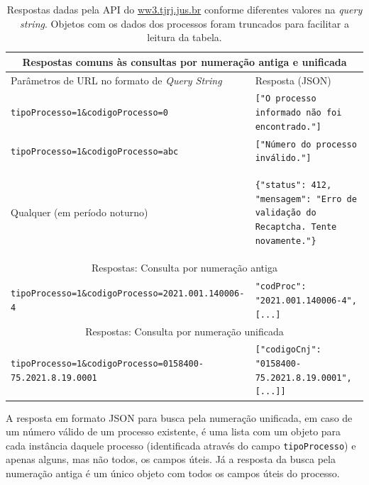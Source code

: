 \begin{table}[htb]
    \tiny
    \centering
    \begin{tabular}{lp{}}
        \toprule
        \multicolumn{2}{c}{Respostas comuns às consultas por numeração antiga e unificada} \\
        \midrule
        Parâmetros de URL no formato de \textit{Query String} & Resposta (JSON) \\
        \midrule
        \texttt{tipoProcesso=1\&codigoProcesso=0} & \texttt{["O processo informado não foi encontrado."]} \\
        \texttt{tipoProcesso=1\&codigoProcesso=abc} & \texttt{["Número do processo inválido."]} \\
        Qualquer (em período noturno) & \begin{minipage}{0.6\textwidth}
            \begin{verbatim}
{"status": 412, "mensagem": "Erro de validação do Recaptcha. Tente novamente."}
            \end{verbatim}
        \end{minipage}
        \\
        \midrule
        \multicolumn{2}{c}{Respostas: Consulta por numeração antiga} \\
        \midrule
        \texttt{tipoProcesso=1\&codigoProcesso=2021.001.140006-4} & \texttt{{"codProc": "2021.001.140006-4", [...]}} \\
        \midrule
        \multicolumn{2}{c}{Respostas: Consulta por numeração unificada} \\
        \midrule
        \texttt{tipoProcesso=1\&codigoProcesso=0158400-75.2021.8.19.0001} & \texttt{[{"codigoCnj": "0158400-75.2021.8.19.0001", [...]}]} \\
        \bottomrule
    \end{tabular}
    \caption{%
        Respostas dadas pela API do \url{ww3.tjrj.jus.br} conforme diferentes
        valores na \textit{query string}. Objetos com os dados dos processos
        foram truncados para facilitar a leitura da tabela.
    }
    \label{tbl:respostas-ww3}
\end{table}

A resposta em formato JSON para busca pela numeração unificada, em caso de um
número válido de um processo existente, é uma lista com um objeto para cada
instância daquele processo (identificada através do campo
\texttt{tipoProcesso}) e apenas alguns, mas não todos, os campos úteis. Já a
resposta da busca pela numeração antiga é um único objeto com todos os campos
úteis do processo.

